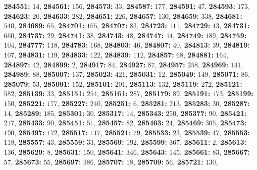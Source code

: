 \textsf{\bfseries 284551:} $14$, \textsf{\bfseries 284561:} $156$, \textsf{\bfseries 284573:} $33$, \textsf{\bfseries 284587:} $177$, \textsf{\bfseries 284591:} $47$, \textsf{\bfseries 284593:} $173$, \textsf{\bfseries 284623:} $20$, \textsf{\bfseries 284633:} $282$, \textsf{\bfseries 284651:} $226$, \textsf{\bfseries 284657:} $130$, \textsf{\bfseries 284659:} $338$, \textsf{\bfseries 284681:} $540$, \textsf{\bfseries 284689:} $65$, \textsf{\bfseries 284701:} $165$, \textsf{\bfseries 284707:} $83$, \textsf{\bfseries 284723:} $111$, \textsf{\bfseries 284729:} $43$, \textsf{\bfseries 284731:} $660$, \textsf{\bfseries 284737:} $29$, \textsf{\bfseries 284741:} $38$, \textsf{\bfseries 284743:} $48$, \textsf{\bfseries 284747:} $44$, \textsf{\bfseries 284749:} $189$, \textsf{\bfseries 284759:} $104$, \textsf{\bfseries 284777:} $118$, \textsf{\bfseries 284783:} $168$, \textsf{\bfseries 284803:} $46$, \textsf{\bfseries 284807:} $40$, \textsf{\bfseries 284813:} $39$, \textsf{\bfseries 284819:} $107$, \textsf{\bfseries 284831:} $119$, \textsf{\bfseries 284833:} $122$, \textsf{\bfseries 284839:} $112$, \textsf{\bfseries 284857:} $68$, \textsf{\bfseries 284881:} $164$, \textsf{\bfseries 284897:} $42$, \textsf{\bfseries 284899:} $2$, \textsf{\bfseries 284917:} $84$, \textsf{\bfseries 284927:} $87$, \textsf{\bfseries 284957:} $258$, \textsf{\bfseries 284969:} $141$, \textsf{\bfseries 284989:} $88$, \textsf{\bfseries 285007:} $137$, \textsf{\bfseries 285023:} $421$, \textsf{\bfseries 285031:} $12$, \textsf{\bfseries 285049:} $149$, \textsf{\bfseries 285071:} $86$, \textsf{\bfseries 285079:} $53$, \textsf{\bfseries 285091:} $152$, \textsf{\bfseries 285101:} $201$, \textsf{\bfseries 285113:} $132$, \textsf{\bfseries 285119:} $272$, \textsf{\bfseries 285121:} $582$, \textsf{\bfseries 285139:} $33$, \textsf{\bfseries 285151:} $254$, \textsf{\bfseries 285161:} $287$, \textsf{\bfseries 285179:} $89$, \textsf{\bfseries 285191:} $173$, \textsf{\bfseries 285199:} $150$, \textsf{\bfseries 285221:} $177$, \textsf{\bfseries 285227:} $240$, \textsf{\bfseries 285251:} $6$, \textsf{\bfseries 285281:} $213$, \textsf{\bfseries 285283:} $30$, \textsf{\bfseries 285287:} $14$, \textsf{\bfseries 285289:} $185$, \textsf{\bfseries 285301:} $30$, \textsf{\bfseries 285317:} $14$, \textsf{\bfseries 285343:} $250$, \textsf{\bfseries 285377:} $90$, \textsf{\bfseries 285421:} $217$, \textsf{\bfseries 285433:} $90$, \textsf{\bfseries 285451:} $51$, \textsf{\bfseries 285457:} $82$, \textsf{\bfseries 285463:} $24$, \textsf{\bfseries 285469:} $305$, \textsf{\bfseries 285473:} $190$, \textsf{\bfseries 285497:} $172$, \textsf{\bfseries 285517:} $117$, \textsf{\bfseries 285521:} $79$, \textsf{\bfseries 285533:} $23$, \textsf{\bfseries 285539:} $47$, \textsf{\bfseries 285553:} $118$, \textsf{\bfseries 285557:} $43$, \textsf{\bfseries 285559:} $33$, \textsf{\bfseries 285569:} $192$, \textsf{\bfseries 285599:} $367$, \textsf{\bfseries 285611:} $2$, \textsf{\bfseries 285613:} $136$, \textsf{\bfseries 285629:} $8$, \textsf{\bfseries 285631:} $150$, \textsf{\bfseries 285641:} $346$, \textsf{\bfseries 285643:} $145$, \textsf{\bfseries 285661:} $83$, \textsf{\bfseries 285667:} $57$, \textsf{\bfseries 285673:} $55$, \textsf{\bfseries 285697:} $386$, \textsf{\bfseries 285707:} $18$, \textsf{\bfseries 285709:} $56$, \textsf{\bfseries 285721:} $130$, 
